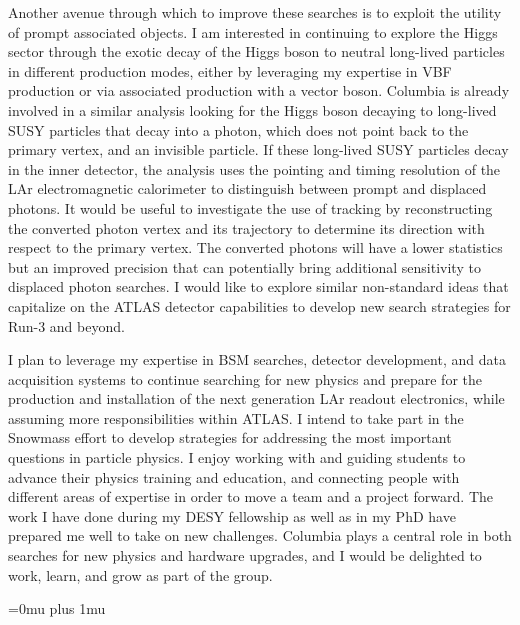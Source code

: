 \documentclass[a4paper]{article}
\begin{document}
Another avenue through which to improve these searches is to exploit the utility of prompt associated objects. I am interested in continuing to explore the Higgs sector through the exotic decay of the Higgs boson to neutral long-lived particles in different production modes, either by leveraging my expertise in VBF production or via associated production with a vector boson. Columbia is already involved in a similar analysis looking for the Higgs boson decaying to long-lived SUSY particles that decay into a photon, which does not point back to the primary vertex, and an invisible particle. If these long-lived SUSY particles decay in the inner detector, the analysis uses the pointing and timing resolution of the LAr electromagnetic calorimeter to distinguish between prompt and displaced photons. It would be useful to investigate the use of tracking by reconstructing the converted photon vertex and its trajectory to determine its direction with respect to the primary vertex. The converted photons will have a lower statistics but an improved precision that can potentially bring additional sensitivity to displaced photon searches. I would like to explore similar non-standard ideas that capitalize on the ATLAS detector capabilities to develop new search strategies for Run-3 and beyond.

\bigskip

I plan to leverage my expertise in BSM searches, detector development, and data acquisition systems to continue searching for new physics and
prepare for the production and installation of the next generation LAr readout electronics, while assuming more responsibilities within ATLAS.  I intend to take part in the Snowmass effort to develop strategies for addressing the most important questions in particle physics. I enjoy working with and guiding students to advance their physics training and education, and connecting people with different areas of expertise in order to move a team and a project forward. The work I have done during my DESY fellowship as well as in my PhD have prepared me well to take on new challenges. Columbia plays a central role in both searches for new physics and hardware upgrades, and I would be delighted to work, learn, and grow as part of the group.



\Urlmuskip=0mu plus 1mu\relax
{%
\fontsize{11}{14}
\selectfont
}{}

\end{document}
